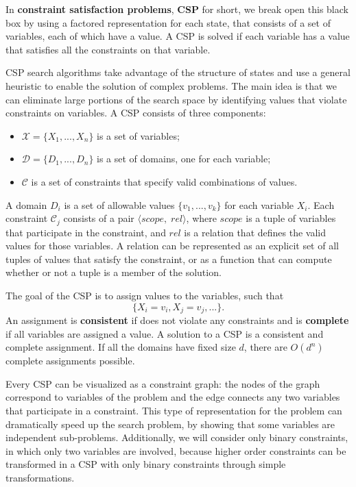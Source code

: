 \documentclass{article}
\begin{document}
In \textbf{constraint satisfaction problems}, \textbf{CSP} for short, we break open this black box by using a factored representation for each state, that consists of a set of variables, each of which have a value. A CSP is solved if each variable has a value that satisfies all the constraints on that variable.

CSP search algorithms take advantage of the structure of states and use a general heuristic to enable the solution of complex problems. The main idea is that we can eliminate large portions of the search space by identifying values that violate constraints on variables. A CSP consists of three components:
\begin{itemize}
    \item $\mathcal{X} =\{X_1, ..., X_n\}$ is a set of variables;
    \item $\mathcal{D} =\{D_1, ..., D_n\}$ is a set of domains, one for each variable;
    \item $\mathcal{C}$ is a set of constraints that specify valid combinations of values.
\end{itemize}

A domain $D_i$ is a set of allowable values $\{v_1, ..., v_k\}$ for each variable $X_i$. Each constraint $\mathcal{C}_j$ consists of a pair $\langle scope,\; rel\rangle$, where $scope$ is a tuple of variables that participate in the constraint, and $rel$ is a relation that defines the valid values for those variables. A relation can be represented as an explicit set of all tuples of values that satisfy the constraint, or as a function that can compute whether or not a tuple is a member of the solution.

The goal of the CSP is to assign values to the variables, such that 
    $$\{X_i=v_i, X_j=v_j, ...\}.$$ 
An assignment is \textbf{consistent} if does not violate any constraints and is \textbf{complete} if all variables are assigned a value. A solution to a CSP is a consistent and complete assignment. If all the domains have fixed size $d$, there are $O(d^n)$ complete assignments possible.

Every CSP can be visualized as a constraint graph: the nodes of the graph correspond to variables of the problem and the edge connects any two variables that participate in a constraint. This type of representation for the problem can dramatically speed up the search problem, by showing that some variables are independent sub-problems. Additionally, we will consider only binary constraints, in which only two variables are involved, because higher order constraints can be transformed in a CSP with only binary constraints through simple transformations.
\end{document}
